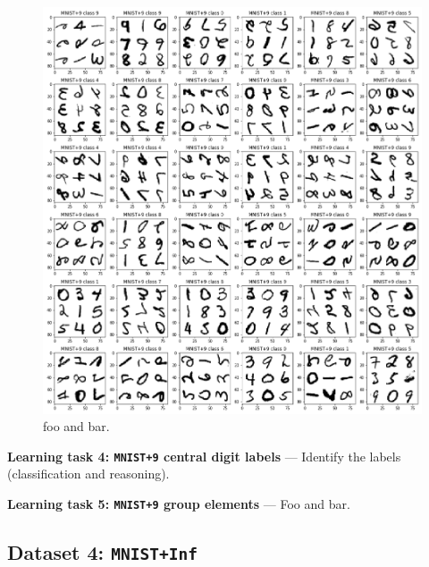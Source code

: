 \documentclass{article}
\renewcommand{\paragraph}[1]{\par\medskip\noindent\textbf{#1} ---}
\begin{document}
\begin{figure}[t!]
\includegraphics[width=\textwidth]{../notebooks/MNIST+9.png}
\caption{foo and bar.\label{fig:9}}
\end{figure}

\paragraph{Learning task 4: \texttt{MNIST+9} central digit labels}
Identify the labels (classification and reasoning).

\paragraph{Learning task 5: \texttt{MNIST+9} group elements}
Foo and bar.

\subsection*{Dataset 4: \texttt{MNIST+Inf}}
\end{document}
